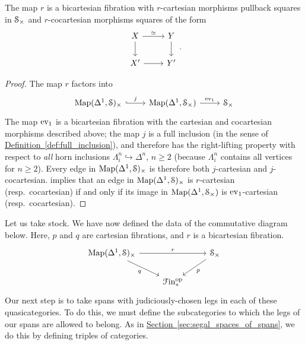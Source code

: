 \documentclass[main.tex]{subfiles}
\begin{document}
\begin{lemma}
  \label{lemma:map_on_cartesian_cats_is_bicart_fib}
  The map $r$ is a bicartesian fibration with $r$-cartesian morphisms pullback squares in $\S_{\times}$ and $r$-cocartesian morphisms squares of the form
  \begin{equation*}
    \begin{tikzcd}
      X
      \arrow[r, "\simeq"]
      \arrow[d]
      & Y
      \arrow[d]
      \\
      X'
      \arrow[r]
      & Y'
    \end{tikzcd}.
  \end{equation*}
\end{lemma}
\begin{proof}
  The map $r$ factors into
  \begin{equation*}
    \begin{tikzcd}
      \Map(\Delta^{1}, \S)_{\times}
      \arrow[r, hook, "j"]
      & \Map(\Delta^{1}, \S_{\times})
      \arrow[r, "\ev_{1}"]
      & \S_{\times}
    \end{tikzcd}
  \end{equation*}
  The map $\ev_{1}$ is a bicartesian fibration with the cartesian and cocartesian morphisms described above; the map $j$ is a full inclusion (in the sense of \hyperref[def:full_inclusion]{Definition~\ref*{def:full_inclusion}}), and therefore has the right-lifting property with respect to \emph{all} horn inclusions $\Lambda^{n}_{i} \hookrightarrow \Delta^{n}$, $n \geq 2$ (because $\Lambda^{n}_{i}$ contains all vertices for $n \geq 2$). Every edge in $\Map(\Delta^{1}, \S)_{\times}$ is therefore both $j$-cartesian and $j$-cocartesian. \cite[Prop\ 2.4.1.3.3]{highertopostheory} implies that an edge in $\Map(\Delta^{1}, \S)_{\times}$ is $r$-cartesian (resp.\ cocartesian) if and only if its image in $\Map(\Delta^{1}, \S_{\times})$ is $\ev_{1}$-cartesian (resp.\ cocartesian).
\end{proof}

Let us take stock. We have now defined the data of the commutative diagram below. Here, $p$ and $q$ are cartesian fibrations, and $r$ is a bicartesian fibration.
\begin{equation}
  \label{eq:data_of_pqr}
  \begin{tikzcd}
    \Map(\Delta^{1}, \S)_{\times}
    \arrow[rr, "r"]
    \arrow[dr, swap, "q"]
    && \S_{\times}
    \arrow[dl, "p"]
    \\
    & \Finp\op
  \end{tikzcd}
\end{equation}
Our next step is to take spans with judiciously-chosen legs in each of these quasicategories. To do this, we must define the subcategories to which the legs of our spans are allowed to belong. As in \hyperref[sec:segal_spaces_of_spans]{Section~\ref*{sec:segal_spaces_of_spans}}, we do this by defining triples of categories.
\end{document}

